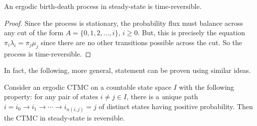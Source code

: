 \documentclass[a4paper,10pt,english]{article}
\begin{document}
\begin{prop}
An ergodic birth-death process in steady-state is time-reversible.
\end{prop}
\begin{proof}
Since the process is stationary, the probability flux must balance across any cut of the form $A = \{0, 1, 2, \ldots, i\}$, $i \geq 0$. %
But, this is precisely the equation $\pi_i \lambda_i = \pi_j \mu_j$ since there are no other transitions possible across the cut. 
So the process is time-reversible. 
\end{proof}

In fact, the following, more general, statement can be proven using similar ideas. 

\begin{prop}
Consider an ergodic CTMC on a countable state space $I$ with the following property: for any pair of states $i \neq j \in I$, there is a {\textit unique} path $i = i_0 \to i_1 \to \cdots \to i_{n(i,j)} = j$ of distinct states having positive probability. Then the CTMC in steady-state is reversible. 
\end{prop}

\end{document}
